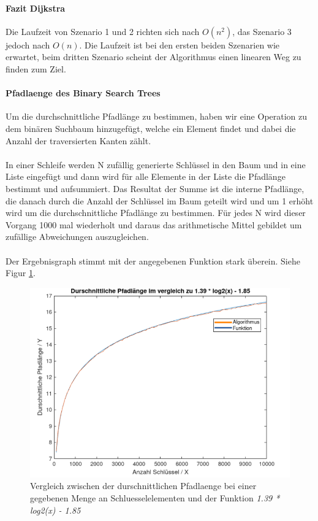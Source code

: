 \documentclass[utf8]{article}
\begin{document}
\paragraph{Fazit Dijkstra} Die Laufzeit von Szenario 1 und 2 richten sich nach
$O(n^2)$, das Szenario 3 jedoch nach $O(n)$. Die Laufzeit ist bei den ersten beiden
Szenarien wie erwartet, beim dritten Szenario scheint der Algorithmus einen
linearen Weg zu finden zum Ziel.

\paragraph{Pfadlaenge des Binary Search Trees}
Um die durchschnittliche Pfadlänge zu bestimmen, haben wir
eine Operation zu dem binären Suchbaum hinzugefügt, welche
ein Element findet und dabei die Anzahl der traversierten
Kanten zählt.\\\\
In einer Schleife werden N zufällig generierte Schlüssel in den Baum
und in eine Liste eingefügt und dann wird für alle Elemente in der
Liste die Pfadlänge bestimmt und aufsummiert. Das Resultat der Summe
ist die interne Pfadlänge, die danach durch die Anzahl der Schlüssel
im Baum geteilt wird und um 1 erhöht wird um die durchschnittliche
Pfadlänge zu bestimmen. Für jedes N wird dieser Vorgang 1000 mal
wiederholt und daraus das arithmetische Mittel gebildet um
zufällige Abweichungen auszugleichen.\\\\
Der Ergebnisgraph stimmt mit der angegebenen
Funktion stark überein. Siehe Figur \ref{figure4}.

\begin{figure}[H]
  \centering
  \includegraphics[width=1\textwidth]{Images/Pfadlaenge3.png}
  \caption[]{Vergleich zwischen der durschnittlichen Pfadlaenge bei einer
  gegebenen Menge an Schluesselelementen und der Funktion \emph{1.39 * log2(x) - 1.85}}
  \label{figure4}
\end{figure}
\end{document}
